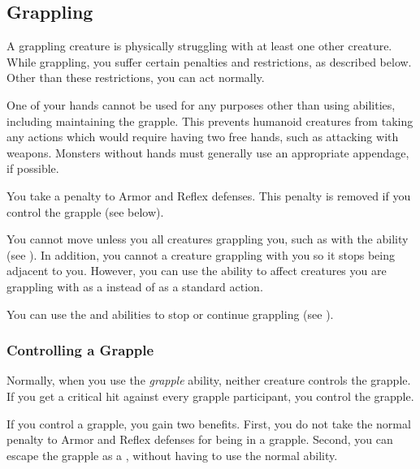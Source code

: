   \subsection{Grappling}\label{Grappling}
    A grappling creature is physically struggling with at least one other creature.
    While grappling, you suffer certain penalties and restrictions, as described below.
    Other than these restrictions, you can act normally.
    \begin{raggeditemize}
      \item One of your hands cannot be used for any purposes other than using  abilities, including maintaining the grapple.
        This prevents humanoid creatures from taking any actions which would require having two free hands, such as attacking with  weapons.
        Monsters without hands must generally use an appropriate appendage, if possible.
      \item You take a  penalty to Armor and Reflex defenses.
        This penalty is removed if you control the grapple (see below).
      \item You cannot move unless you  all creatures grappling you, such as with the  ability (see ).
        In addition, you cannot  a creature grappling with you so it stops being adjacent to you.
        However, you can use the  ability to affect creatures you are grappling with as a  instead of as a standard action.
      \item You can use the  and  abilities to stop or continue grappling (see ).
    \end{raggeditemize}

    \subsubsection{Controlling a Grapple}\label{Controlling a Grapple}
      Normally, when you use the \textit{grapple} ability, neither creature controls the grapple.
      If you get a critical hit against every grapple participant, you control the grapple.

      If you control a grapple, you gain two benefits.
      First, you do not take the normal  penalty to Armor and Reflex defenses for being in a grapple.
      Second, you can escape the grapple as a , without having to use the normal  ability.


